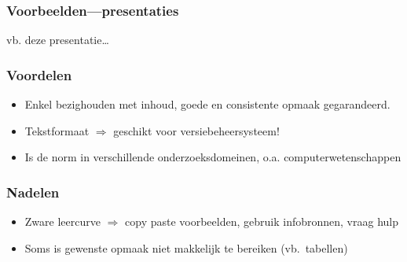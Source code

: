 \documentclass{beamer}
\begin{document}
\begin{frame}
  \frametitle{Voorbeelden---presentaties}

  \begin{center}
  vb. deze presentatie\ldots
  \end{center}

\end{frame}

\begin{frame}
  \frametitle{Voordelen}

  \begin{itemize}
    \item<+-> Enkel bezighouden met inhoud, goede en consistente opmaak gegarandeerd.
    \item<+-> Tekstformaat $\Rightarrow$ geschikt voor versiebeheersysteem!
    \item<+-> Is de norm in verschillende onderzoeksdomeinen, o.a. computerwetenschappen
  \end{itemize}
\end{frame}


\begin{frame}
  \frametitle{Nadelen}

  \begin{itemize}
    \item<+-> Zware leercurve $\Rightarrow$ copy paste voorbeelden, gebruik infobronnen, vraag hulp
    \item<+-> Soms is gewenste opmaak niet makkelijk te bereiken (vb.~tabellen)
  \end{itemize}

\end{frame}
\end{document}
